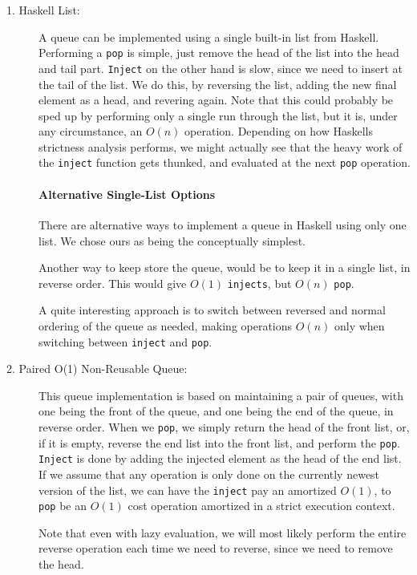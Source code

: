 \begin{description}
\item[1. Haskell List:] 
A queue can be implemented using a single built-in list from Haskell. 
Performing a \texttt{pop} is simple, just remove the head of the list into the head and tail part.
\texttt{Inject} on the other hand is slow, since we need to insert at the tail of the list. We do this, by reversing the list, adding the new final element as a head, and revering again. Note that this could probably be sped up by performing only a single run through the list, but it is, under any circumstance, an $O(n)$ operation.
Depending on how Haskells strictness analysis performs, we might actually see that the heavy work of the \texttt{inject} function gets thunked, and evaluated at the next \texttt{pop} operation.

\paragraph{Alternative Single-List Options}

There are alternative ways to implement a queue in Haskell using only one list. We chose ours as being the conceptually simplest.

Another way to keep store the queue, would be to keep it in a single list, in reverse order. This would give $O(1)$ \texttt{injects}, but $O(n)$ \texttt{pop}.

A quite interesting approach is to switch between reversed and normal ordering of the queue as needed, making operations $O(n)$ only when switching between \texttt{inject} and \texttt{pop}. 

\item[2. Paired O(1) Non-Reusable Queue:]
This queue implementation is based on maintaining a pair of queues, with one being the front of the queue, and one being the end of the queue, in reverse order. 
When we \texttt{pop}, we simply return the head of the front list, or, if it is empty, reverse the end list into the front list, and perform the \texttt{pop}.
\texttt{Inject} is done by adding the injected element as the head of the end list.
If we assume that any operation is only done on the currently newest version of the list, we can have the \texttt{inject} pay an amortized $O(1)$, to \texttt{pop} be an $O(1)$ cost operation amortized in a strict execution context.

Note that even with lazy evaluation, we will most likely perform the entire reverse operation each time we need to reverse, since we need to remove the head.


\end{description}
